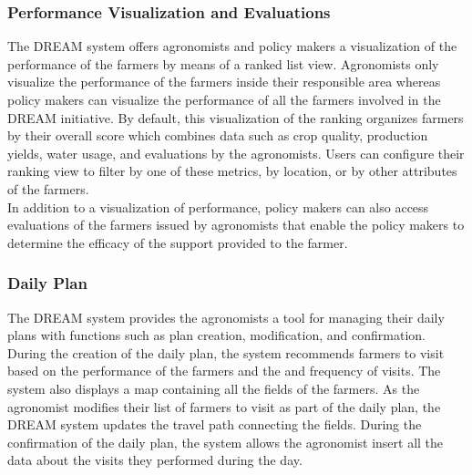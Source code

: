 \begin{flushleft}
\subsubsection{Performance Visualization and Evaluations}
The DREAM system offers agronomists and policy makers a visualization of the performance of the farmers by means of a ranked list view. Agronomists only visualize the performance of the farmers inside their responsible area whereas policy makers can visualize the performance of all the farmers involved in the DREAM initiative. By default, this visualization of the ranking organizes farmers by their overall score which combines data such as crop quality, production yields, water usage, and evaluations by the agronomists. Users can configure their ranking view to filter by one of these metrics, by location, or by other attributes of the farmers. \\
\smallskip
In addition to a visualization of performance, policy makers can also access evaluations of the farmers issued by agronomists that enable the policy makers to determine the efficacy of the support provided to the farmer. 

\subsubsection{Daily Plan}
The DREAM system provides the agronomists a tool for managing their daily plans with functions such as plan creation, modification, and confirmation. During the creation of the daily plan, the system recommends farmers to visit based on the performance of the farmers and the and frequency of visits. The system also displays a map containing all the fields of the farmers. As the agronomist modifies their list of farmers to visit as part of the daily plan, the DREAM system updates the travel path connecting the fields. During the confirmation of the daily plan, the system allows the agronomist insert all the data about the visits they performed during the day.
\end{flushleft}

